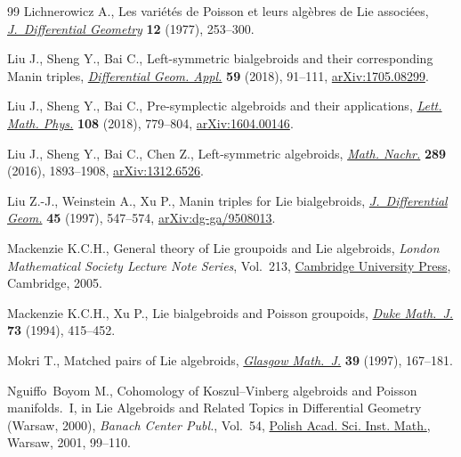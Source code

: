 \documentclass[10pt,a4paper]{amsart}
\numberwithin{equation}{section}
\begin{document}
\begin{thebibliography}{99}
Lichnerowicz A., Les vari\'et\'es de {P}oisson et leurs alg\`ebres de {L}ie
 associ\'ees, \href{https://doi.org/10.4310/jdg/1214433987}{\textit{J.~Differential Geometry}} \textbf{12} (1977), 253--300.

Liu J., Sheng Y., Bai C., Left-symmetric bialgebroids and their corresponding
 {M}anin triples, \href{https://doi.org/10.1016/j.difgeo.2018.04.003}{\textit{Differential Geom. Appl.}} \textbf{59} (2018),
 91--111, \href{https://arxiv.org/abs/1705.08299}{arXiv:1705.08299}.

Liu J., Sheng Y., Bai C., Pre-symplectic algebroids and their applications,
 \href{https://doi.org/10.1007/s11005-017-0973-8}{\textit{Lett. Math. Phys.}} \textbf{108} (2018), 779--804,
 \href{https://arxiv.org/abs/1604.00146}{arXiv:1604.00146}.

Liu J., Sheng Y., Bai C., Chen Z., Left-symmetric algebroids, \href{https://doi.org/10.1002/mana.201300339}{\textit{Math.
 Nachr.}} \textbf{289} (2016), 1893--1908, \href{https://arxiv.org/abs/1312.6526}{arXiv:1312.6526}.

Liu Z.-J., Weinstein A., Xu P., Manin triples for {L}ie bialgebroids,
 \href{https://doi.org/10.4310/jdg/1214459842}{\textit{J.~Differential Geom.}} \textbf{45} (1997), 547--574,
 \href{https://arxiv.org/abs/dg-ga/9508013}{arXiv:dg-ga/9508013}.

Mackenzie K.C.H., General theory of {L}ie groupoids and {L}ie algebroids,
 \textit{London Mathematical Society Lecture Note Series}, Vol.~213, \href{https://doi.org/10.1017/CBO9781107325883}{Cambridge
 University Press}, Cambridge, 2005.

Mackenzie K.C.H., Xu P., Lie bialgebroids and {P}oisson groupoids, \href{https://doi.org/10.1215/S0012-7094-94-07318-3}{\textit{Duke
 Math.~J.}} \textbf{73} (1994), 415--452.

Mokri T., Matched pairs of {L}ie algebroids, \href{https://doi.org/10.1017/S0017089500032055}{\textit{Glasgow Math.~J.}}
 \textbf{39} (1997), 167--181.

Nguiffo~Boyom M., Cohomology of {K}oszul--{V}inberg algebroids and {P}oisson
 manifolds.~{I}, in Lie Algebroids and Related Topics in Differential Geometry
 ({W}arsaw, 2000), \textit{Banach Center Publ.}, Vol.~54, \href{https://doi.org/10.4064/bc54-0-7}{Polish Acad. Sci.
 Inst. Math.}, Warsaw, 2001, 99--110.


\end{thebibliography}
\end{document}
